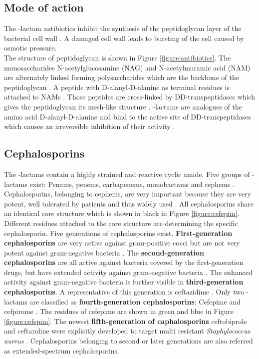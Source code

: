\subsection{Mode of action}
The \textbeta-lactam antibiotics inhibit the synthesis of the peptidoglycan layer of the bacterial cell wall \cite{fisher_bacterial_2005}. A damaged cell wall leads to bursting of the cell caused by osmotic pressure. \\
The structure of peptidoglycan is shown in Figure \ref{figure:antibiotics}. 
The monosaccharides  N-acetylglucosamine (NAG) and N-acetylmuramic acid (NAM) are alternately linked forming polysaccharides which are the backbone of the peptidoglycan \cite{fisher_bacterial_2005}.
A peptide with D-alanyl-D-alanine as terminal residues is attached to NAMs \cite{fisher_bacterial_2005}. Those peptides are cross-linked by DD-transpeptidases which gives the peptidoglycan its mesh-like structure \cite{fisher_bacterial_2005}. \textbeta-lactams are analogues of the amino acid D-alanyl-D-alanine and bind to the active site of DD-transpeptidases which causes an irreversible inhibition of their activity \cite{fisher_bacterial_2005}. 

\subsection{Cephalosporins}
The \textbeta-lactams contain a highly strained and reactive cyclic amide. Five groups of \textbeta-lactams exist: Penams, penems, carbapenems, monobactams and cephems \cite{beta-lactam_nodate}. 
Cephalosporins, belonging to cephems, are very important because they are very potent, well tolerated by patients and thus widely used \cite{dancer_problem_2001}. 
All cephalosporins share an identical core structure which is shown in black in Figure \ref{figure:cefepim}. Different residues attached to the core structure are determining the specific cephalosporin. Five generations of cephalosporins exist.
\textbf{First-generation cephalosporins} are very active against gram-positive cocci but are not very potent against gram-negative bacteria \cite{fernandes_-lactams:_2013}. The \textbf{second-generation cephalosporins} are all active against bacteria covered by the first-generation drugs, but have extended activity against gram-negative bacteria \cite{fernandes_-lactams:_2013}. The enhanced activity against gram-negative bacteria is further visible in \textbf{third-generation cephalosporins}. A representative of this generation is ceftazidime \cite{klein_third-generation_1995}. Only two \textbeta-lactams are classified as \textbf{fourth-generation cephalosporins}: Cefepime and cefpirome \cite{fernandes_-lactams:_2013}. The residues of cefepime are shown in green and blue in Figure \ref{figure:cefepim}. The newest \textbf{fifth-generation of caphalosporins} ceftobiprole and ceftaroline  were explicitly developed to target multi resistant \textit{Staphylococcus aureus} \cite{fernandes_-lactams:_2013}. Cephalosporins belonging to second or later generations are also referred as extended-spectrum cephalosporins.


